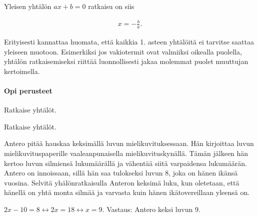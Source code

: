 Yleisen yhtälön $ax + b = 0$ ratkaisu on siis

\begin{align*}
  x = -\frac{b}{a}.
\end{align*}

Erityisesti kannattaa huomata, että kaikkia 1. asteen yhtälöitä ei tarvitse
saattaa yleiseen muotoon. Esimerkiksi jos vakiotermit ovat valmiiksi
oikealla puolella, yhtälön ratkaisemiseksi riittää luonnollisesti jakaa
molemmat puolet muuttujan kertoimella.

\begin{tehtavasivu}

\paragraph*{Opi perusteet}

\begin{tehtava}
    Ratkaise yhtälöt.
    \begin{alakohdat}
    \end{alakohdat}
    \begin{vastaus}
        \begin{alakohdat}
        \end{alakohdat}
    \end{vastaus}
\end{tehtava}

\begin{tehtava}
    Ratkaise yhtälöt.
    \begin{alakohdat}
    \end{alakohdat}
    \begin{vastaus}
        \begin{alakohdat}
        \end{alakohdat}
    \end{vastaus}
\end{tehtava}

\begin{tehtava}
    Antero pitää hauskaa keksimällä luvun mielikuvituksessaan. Hän kirjoittaa
    luvun mielikuvituspaperille vaaleanpunaisella mielikuvituskynällä. Tämän jälkeen hän
    kertoo luvun silmiensä lukumäärällä ja vähentää siitä varpaidensa lukumäärän. Antero
    on innoissaan, sillä hän saa tulokseksi luvun 8, joka on hänen ikänsä vuosina. Selvitä
    yhälönratkaisulla Anteron keksimä luku, kun oletetaan, että hänellä on yhtä monta silmää
    ja varvasta kuin hänen ikätovereillaan yleensä on.
    \begin{vastaus}
        $2x-10=8 \leftrightarrow 2x=18 \leftrightarrow x=9$. Vastaus: Antero keksi luvun 9.
    \end{vastaus}
\end{tehtava}


\end{tehtavasivu}

